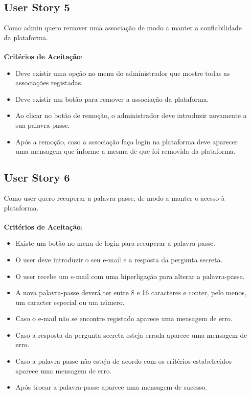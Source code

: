 \documentclass[a4paper,11pt]{article}
\begin{document}
\subsection{User Story 5}
Como admin quero remover uma associação de modo a manter a confiabilidade da plataforma.\\\\
\textbf{Critérios de Aceitação}:
\begin{itemize}
  \item Deve existir uma opção no menu do administrador que mostre todas as associações registadas.
  \item Deve existir um botão para remover a associação da plataforma.
  \item Ao clicar no botão de remoção, o administrador deve introduzir novamente a sua palavra-passe.
  \item Após a remoção, caso a associação faça login na plataforma deve aparecer uma mensagem que informe a mesma de que foi removida da plataforma.
\end{itemize}

\subsection{User Story 6}
Como user quero recuperar a palavra-passe, de modo a manter o acesso à plataforma.\\\\
\textbf{Critérios de Aceitação}:
\begin{itemize}
  \item Existe um botão no menu de login para recuperar a palavra-passe.
  \item O user deve introduzir o seu e-mail e a resposta da pergunta secreta.
  \item O user recebe um e-mail com uma hiperligação para alterar a palavra-passe.
  \item A nova palavra-passe deverá ter entre 8 e 16 caracteres e conter, pelo menos, um caracter especial ou um número.
  \item Caso o e-mail não se encontre registado aparece uma mensagem de erro.
  \item Caso a resposta da pergunta secreta esteja errada aparece uma mensagem de erro.
  \item Caso a palavra-passe não esteja de acordo com os critérios estabelecidos aparece uma mensagem de erro.
  \item Após trocar a palavra-passe aparece uma mensagem de sucesso.
\end{itemize}
\end{document}
